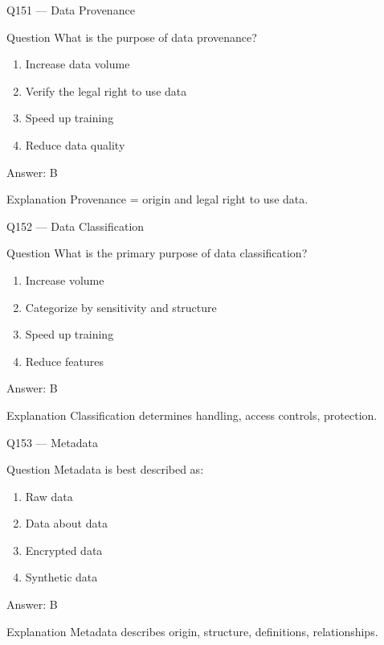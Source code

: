 \documentclass[aspectratio=169,8pt]{beamer}
\begin{document}
	\begin{frame}{Q151 --- Data Provenance}
		\begin{block}{Question}
			What is the purpose of data provenance?
		\end{block}
		\begin{enumerate}
			\item Increase data volume
			\item Verify the legal right to use data
			\item Speed up training
			\item Reduce data quality
		\end{enumerate}
		\begin{exampleblock}{Answer: B}\end{exampleblock}
		\begin{block}{Explanation}
			Provenance = origin and legal right to use data.
		\end{block}
	\end{frame}
	
	\begin{frame}{Q152 --- Data Classification}
		\begin{block}{Question}
			What is the primary purpose of data classification?
		\end{block}
		\begin{enumerate}
			\item Increase volume
			\item Categorize by sensitivity and structure
			\item Speed up training
			\item Reduce features
		\end{enumerate}
		\begin{exampleblock}{Answer: B}\end{exampleblock}
		\begin{block}{Explanation}
			Classification determines handling, access controls, protection.
		\end{block}
	\end{frame}
	
	\begin{frame}{Q153 --- Metadata}
		\begin{block}{Question}
			Metadata is best described as:
		\end{block}
		\begin{enumerate}
			\item Raw data
			\item Data about data
			\item Encrypted data
			\item Synthetic data
		\end{enumerate}
		\begin{exampleblock}{Answer: B}\end{exampleblock}
		\begin{block}{Explanation}
			Metadata describes origin, structure, definitions, relationships.
		\end{block}
	\end{frame}
	
\end{document}

